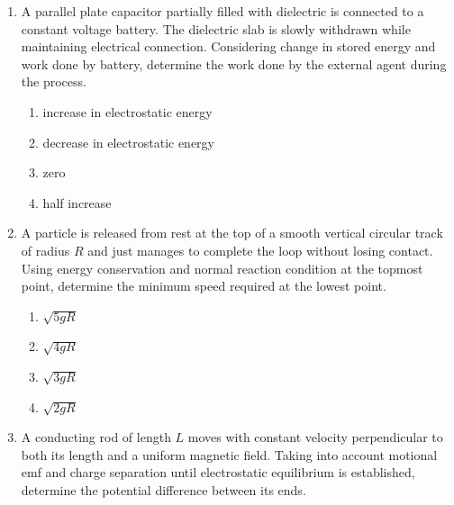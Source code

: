 \documentclass[12pt]{article}
\begin{document}
\begin{enumerate}
\begin{enumerate}[label=\Alph*)]
\item $\sqrt{\dfrac{g}{L}}$
\item $\sqrt{\dfrac{2g}{L}}$
\item $\sqrt{\dfrac{4g}{L}}$
\item $\sqrt{\dfrac{g}{2L}}$
\end{enumerate}


\item
A parallel plate capacitor partially filled with dielectric is connected to a constant voltage battery. The dielectric slab is slowly withdrawn while maintaining electrical connection. Considering change in stored energy and work done by battery, determine the work done by the external agent during the process.

\begin{enumerate}[label=\Alph*)]
\item increase in electrostatic energy
\item decrease in electrostatic energy
\item zero
\item half increase
\end{enumerate}


\item
A particle is released from rest at the top of a smooth vertical circular track of radius $R$ and just manages to complete the loop without losing contact. Using energy conservation and normal reaction condition at the topmost point, determine the minimum speed required at the lowest point.

\begin{enumerate}[label=\Alph*)]
\item $\sqrt{5gR}$
\item $\sqrt{4gR}$
\item $\sqrt{3gR}$
\item $\sqrt{2gR}$
\end{enumerate}


\item
A conducting rod of length $L$ moves with constant velocity perpendicular to both its length and a uniform magnetic field. Taking into account motional emf and charge separation until electrostatic equilibrium is established, determine the potential difference between its ends.


\end{enumerate}
\end{document}
